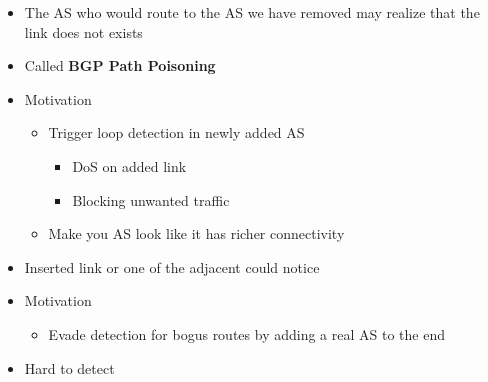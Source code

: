 \begin{itemize}
\begin{itemize}
\begin{itemize}
\begin{itemize}
\begin{itemize}
\begin{itemize}
                                            \item The AS who would route to the AS we have removed may realize that the link does not exists
                                        \end{itemize}
                                \end{itemize}
                                \begin{itemize}
                                    \item Called \textbf{BGP Path Poisoning}
                                    \item Motivation
                                        \begin{itemize}
                                            \item Trigger loop detection in newly added AS
                                                \begin{itemize}
                                                    \item DoS on added link
                                                    \item Blocking unwanted traffic
                                                \end{itemize}
                                            \item Make you AS look like it has richer connectivity
                                        \end{itemize}
                                    \item Inserted link or one of the adjacent could notice
                                \end{itemize}
                                \begin{itemize}
                                    \item Motivation
                                        \begin{itemize}
                                            \item Evade detection for bogus routes by adding a real AS to the end
                                        \end{itemize}
                                    \item Hard to detect
                                \end{itemize}

\end{itemize}
\end{itemize}
\end{itemize}
\end{itemize}
